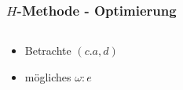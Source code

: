 \documentclass[10pt]{beamer}
\begin{document}
\begin{frame}
  \frametitle{$H$-Methode - Optimierung}

  \begin{columns}[T] %
    \begin{column}{.3\textwidth}
	    \begin{itemize}
		  \item Betrachte $(c.a,d)$
		  \item mögliches $\omega: e$
	    \end{itemize}
    \end{column}%

    \begin{column}{.70\textwidth}
    \end{column}%
  \end{columns}
\end{frame}
\end{document}
